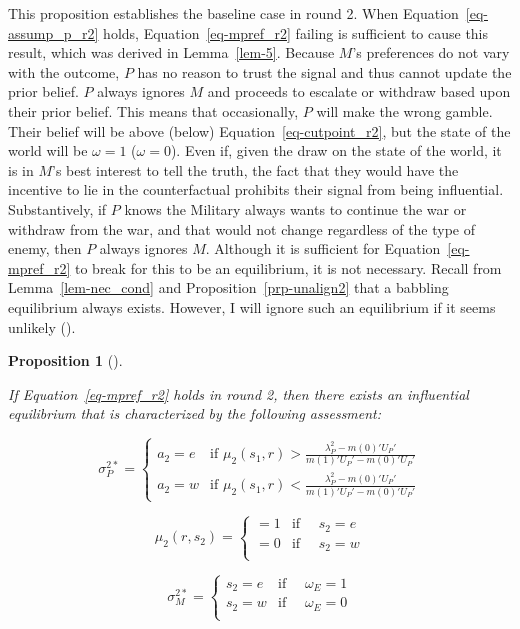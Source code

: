 \documentclass[
  12pt,
]{article}
\theoremstyle{plain}
\theoremstyle{plain}
\newtheorem{proposition}{Proposition}[section]
\theoremstyle{remark}
\begin{document}
This proposition establishes the baseline case in round 2. When
Equation~\ref{eq-assump_p_r2} holds, Equation~\ref{eq-mpref_r2} failing
is sufficient to cause this result, which was derived in
Lemma~\ref{lem-5}. Because \(M\)'s preferences do not vary with the
outcome, \(P\) has no reason to trust the signal and thus cannot update
the prior belief. \(P\) always ignores \(M\) and proceeds to escalate or
withdraw based upon their prior belief. This means that occasionally,
\(P\) will make the wrong gamble. Their belief will be above (below)
Equation~\ref{eq-cutpoint_r2}, but the state of the world will be
\(\omega = 1\) (\(\omega = 0\)). Even if, given the draw on the state of
the world, it is in \(M\)'s best interest to tell the truth, the fact
that they would have the incentive to lie in the counterfactual
prohibits their signal from being influential. Substantively, if \(P\)
knows the Military always wants to continue the war or withdraw from the
war, and that would not change regardless of the type of enemy, then
\(P\) always ignores \(M\). Although it is sufficient for
Equation~\ref{eq-mpref_r2} to break for this to be an equilibrium, it is
not necessary. Recall from Lemma~\ref{lem-nec_cond} and
Proposition~\ref{prp-unalign2} that a babbling equilibrium always
exists. However, I will ignore such an equilibrium if it seems unlikely
().

\begin{proposition}[]\protect\hypertarget{prp-aligned2}{}\label{prp-aligned2}

If Equation~\ref{eq-mpref_r2} holds in round 2, then there exists an
influential equilibrium that is characterized by the following
assessment:

\[
\sigma_P^{2*} = 
\begin{cases} 
a_2 = e & \text{if } \mu_2(s_1, r) > \frac{\lambda^2_P - m(0)' U_P '}{m(1)' U_P' - m(0)' U_P'}\\
a_2 = w & \text{if } \mu_2(s_1, r) < \frac{\lambda^2_P - m(0)' U_P '}{m(1)' U_P' - m(0)' U_P'}
\end{cases}
\]

\[
\mu_2(r, s_2) =
\begin{cases} 
 = 1 & \text{if } \quad s_2 = e \\
= 0 & \text{if } \quad s_2 = w  \\
\end{cases}
\]

\[
\sigma_M^{2*} = 
\begin{cases} 
s_2 =  e & \text{if } \quad \omega_E = 1 \\
s_2 =  w & \text{if } \quad \omega_E = 0 \\
\end{cases}
\]

\end{proposition}
\end{document}
